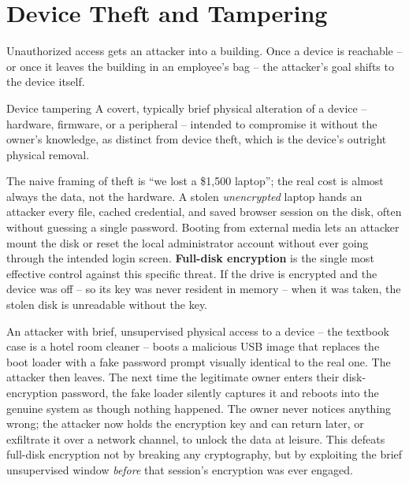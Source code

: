 \section{Device Theft and Tampering}

Unauthorized access gets an attacker into a building. Once a device is reachable -- or once it
leaves the building in an employee's bag -- the attacker's goal shifts to the device itself.

\begin{definition}{Device tampering}
A covert, typically brief physical alteration of a device -- hardware, firmware, or a peripheral
-- intended to compromise it without the owner's knowledge, as distinct from device theft, which
is the device's outright physical removal.
\end{definition}

The naive framing of theft is ``we lost a \$1{,}500 laptop''; the real cost is almost always the
data, not the hardware. A stolen \emph{unencrypted} laptop hands an attacker every file, cached
credential, and saved browser session on the disk, often without guessing a single password.
Booting from external media lets an attacker mount the disk or reset the local administrator
account without ever going through the intended login screen. \textbf{Full-disk encryption} is the
single most effective control against this specific threat. If the drive is encrypted and the
device was off -- so its key was never resident in memory -- when it was taken, the stolen disk is
unreadable without the key.

\begin{example}
An attacker with brief, unsupervised physical access to a device -- the textbook case is a hotel
room cleaner -- boots a malicious USB image that replaces the boot loader with a fake password
prompt visually identical to the real one. The attacker then leaves. The next time the legitimate
owner enters their disk-encryption password, the fake loader silently captures it and reboots into the genuine
system as though nothing happened. The owner never notices anything wrong; the attacker now holds
the encryption key and can return later, or exfiltrate it over a network channel, to unlock the
data at leisure. This defeats full-disk encryption not by breaking any cryptography, but by
exploiting the brief unsupervised window \emph{before} that session's encryption was ever engaged.
\end{example}

